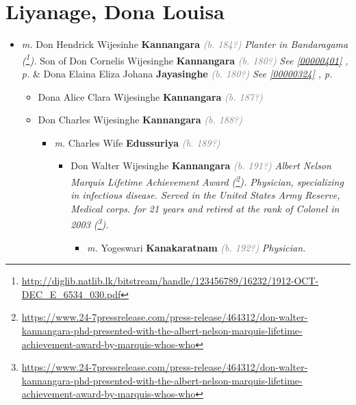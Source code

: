 \documentclass[10pt, openany]{book}
\begin{document}
\chapter{Liyanage, Dona Louisa}
\label{00000512}
\textcolor{slmaroon}{\textit{}}
\begin{itemize}
\item{\textit{m.} Don Hendrick Wijesinhe  \textbf{Kannangara} \textcolor{gray}{\textit{(b. 184?)}} \textcolor{slmaroon}{\textit{Planter in Bandaragama (\footnote{\url{http://diglib.natlib.lk/bitstream/handle/123456789/16232/1912-OCT-DEC_E_6534_030.pdf}}).}} Son of  Don Cornelis Wijesinghe \textbf{Kannangara} \textcolor{gray}{\textit{(b. 180?)}} \textcolor{slteal}{\textit{See  \autoref{00000401} \textit{, p. \pageref{00000401} }}}  \&  Dona Elaina Eliza Johana \textbf{Jayasinghe} \textcolor{gray}{\textit{(b. 180?)}} \textcolor{slteal}{\textit{See  \autoref{00000324} \textit{, p. \pageref{00000324} }}}   \label{couple:00000403:00000512} \begin{itemize}
\item{Dona Alice Clara Wijesinghe \textbf{Kannangara} \textcolor{gray}{\textit{(b. 187?)}}
    }
\item{Don Charles Wijesinghe \textbf{Kannangara} \textcolor{gray}{\textit{(b. 188?)}}
\begin{itemize}
\item{\textit{m.} Charles Wife \textbf{Edussuriya} \textcolor{gray}{\textit{(b. 189?)}}   \label{couple:00000185:00000399} \begin{itemize}
\item{Don Walter Wijesinghe \textbf{Kannangara} \textcolor{gray}{\textit{(b. 191?)}} \textcolor{slmaroon}{\textit{Albert Nelson Marquis Lifetime Achievement Award (\footnote{\url{https://www.24-7pressrelease.com/press-release/464312/don-walter-kannangara-phd-presented-with-the-albert-nelson-marquis-lifetime-achievement-award-by-marquis-whos-who}}).
Physician, specializing in infectious disease.
Served in the United States Army Reserve, Medical corps. for 21 years and retired at the rank of Colonel in 2003 (\footnote{\url{https://www.24-7pressrelease.com/press-release/464312/don-walter-kannangara-phd-presented-with-the-albert-nelson-marquis-lifetime-achievement-award-by-marquis-whos-who}}).}}
\begin{itemize}
\item{\textit{m.} Yogeswari \textbf{Kanakaratnam} \textcolor{gray}{\textit{(b. 192?)}} \textcolor{slmaroon}{\textit{Physician.}}   \label{couple:00000380:00000410} \begin{itemize}

\end{itemize}}
\end{itemize}}
\end{itemize}}
\end{itemize}}
\end{itemize}}
\end{itemize}
\end{document}
